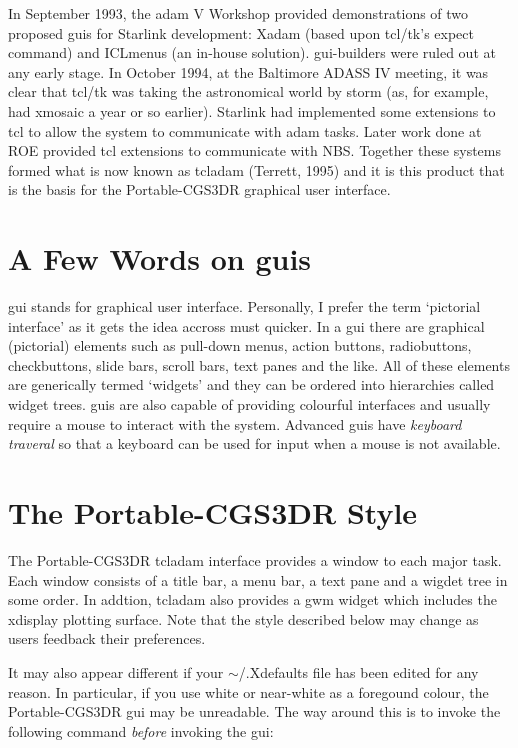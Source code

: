 \documentclass[a4paper]{book}
\renewcommand{\_}{{\tt\char'137}}
\begin{document}
In September 1993, the {\sc adam} V Workshop provided demonstrations of two
proposed {\sc gui}s for Starlink development: Xadam (based upon tcl/tk's expect
command) and ICLmenus (an in-house solution). {\sc gui}-builders were ruled out
at any early stage. In October 1994, at the Baltimore ADASS IV meeting, it
was clear that tcl/tk was taking the astronomical world by storm (as, for
example, had xmosaic a year or so earlier). Starlink had implemented some
extensions to tcl to allow the system to communicate with {\sc adam} tasks.
Later work done at ROE provided tcl extensions to communicate with NBS.
Together these systems formed what is now known as {\sc tcladam} (Terrett, 1995)
and it is this product that is the basis for the Portable-CGS3DR graphical
user interface. 

\section{A Few Words on {\sc gui}s}
{\sc gui} stands for graphical user interface. Personally, I prefer the term
`pictorial interface' as it gets the idea accross must quicker. In a {\sc gui}
there are graphical (pictorial) elements such as pull-down menus, action
buttons, radiobuttons, checkbuttons, slide bars, scroll bars, text panes
and the like. All of these elements are generically termed `widgets' and
they can be ordered into hierarchies called widget trees. {\sc gui}s are also
capable of providing colourful interfaces and usually require a mouse to
interact with the system. Advanced {\sc gui}s have {\em keyboard traveral} so
that a keyboard can be used for input when a mouse is not available. 

\section{The Portable-CGS3DR Style}
The Portable-CGS3DR {\sc tcladam} interface provides a window to each major
task. Each window consists of a title bar, a menu bar, a text pane and a
wigdet tree in some order. In addtion, {\sc tcladam} also provides a {\sc gwm} widget
which includes the xdisplay plotting surface. Note that the style described
below may change as users feedback their preferences. 

It may also appear different if your $\sim$/.Xdefaults file has been edited for any reason.
In particular, if you use white or near-white as a foregound colour, the Portable-CGS3DR
{\sc gui} may be unreadable. The way around this is to invoke the following command
{\em before} invoking the {\sc gui}:
\end{document}
